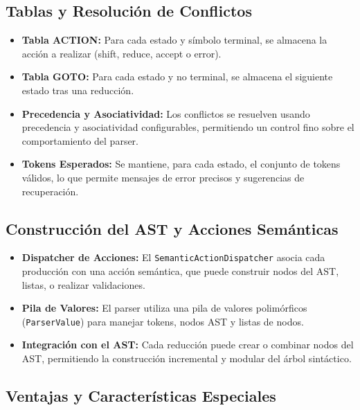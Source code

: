 \documentclass[11pt, a4paper, twoside]{article} %
\begin{document}
\subsection{Tablas y Resolución de Conflictos}

\begin{itemize}
    \item \textbf{Tabla ACTION:} Para cada estado y símbolo terminal, se almacena la acción a realizar (shift, reduce, accept o error).
    \item \textbf{Tabla GOTO:} Para cada estado y no terminal, se almacena el siguiente estado tras una reducción.
    \item \textbf{Precedencia y Asociatividad:} Los conflictos se resuelven usando precedencia y asociatividad configurables, permitiendo un control fino sobre el comportamiento del parser.
    \item \textbf{Tokens Esperados:} Se mantiene, para cada estado, el conjunto de tokens válidos, lo que permite mensajes de error precisos y sugerencias de recuperación.
\end{itemize}

\subsection{Construcción del AST y Acciones Semánticas}

\begin{itemize}
    \item \textbf{Dispatcher de Acciones:} El \texttt{SemanticActionDispatcher} asocia cada producción con una acción semántica, que puede construir nodos del AST, listas, o realizar validaciones.
    \item \textbf{Pila de Valores:} El parser utiliza una pila de valores polimórficos (\texttt{ParserValue}) para manejar tokens, nodos AST y listas de nodos.
    \item \textbf{Integración con el AST:} Cada reducción puede crear o combinar nodos del AST, permitiendo la construcción incremental y modular del árbol sintáctico.
\end{itemize}

\subsection{Ventajas y Características Especiales}
\end{document}
